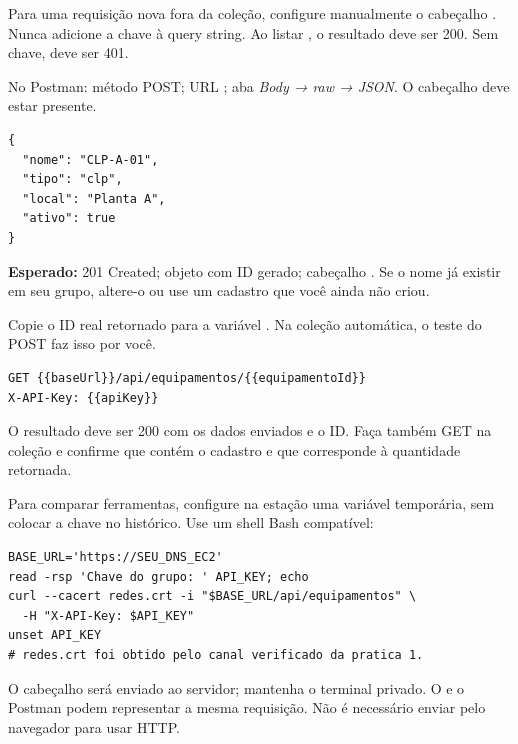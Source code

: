 Para uma requisição nova fora da coleção, configure manualmente o cabeçalho . Nunca adicione a chave à query string. Ao listar , o resultado deve ser 200. Sem chave, deve ser 401.


No Postman: método POST; URL ; aba \textit{Body → raw → JSON}. O cabeçalho  deve estar presente.
\begin{lstlisting}
{
  "nome": "CLP-A-01",
  "tipo": "clp",
  "local": "Planta A",
  "ativo": true
}
\end{lstlisting}
\textbf{Esperado:} 201 Created; objeto com ID gerado; cabeçalho . Se o nome já existir em seu grupo, altere-o ou use um cadastro que você ainda não criou.

Copie o ID real retornado para a variável . Na coleção automática, o teste do POST faz isso por você.
\begin{lstlisting}
GET {{baseUrl}}/api/equipamentos/{{equipamentoId}}
X-API-Key: {{apiKey}}
\end{lstlisting}
O resultado deve ser 200 com os dados enviados e o ID. Faça também GET na coleção e confirme que  contém o cadastro e que  corresponde à quantidade retornada.

Para comparar ferramentas, configure na estação uma variável temporária, sem colocar a chave no histórico. Use um shell Bash compatível:
\begin{lstlisting}
BASE_URL='https://SEU_DNS_EC2'
read -rsp 'Chave do grupo: ' API_KEY; echo
curl --cacert redes.crt -i "$BASE_URL/api/equipamentos" \
  -H "X-API-Key: $API_KEY"
unset API_KEY
# redes.crt foi obtido pelo canal verificado da pratica 1.
\end{lstlisting}
O cabeçalho será enviado ao servidor; mantenha o terminal privado. O  e o Postman podem representar a mesma requisição. Não é necessário enviar pelo navegador para usar HTTP.



